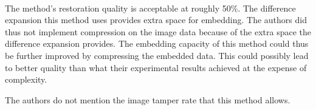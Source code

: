 \documentclass[11pt]{article}
\begin{document}
\hspace{0pt} \\
The method's restoration quality is acceptable at roughly 50\%. 
The difference expansion this method uses provides extra space for embedding.
The authors did thus not implement compression on the image data because of the extra space the difference expansion provides.
The embedding capacity of this method could thus be further improved by compressing the embedded data. This could possibly lead to better quality than what their experimental results achieved at the expense of complexity.

The authors do not mention the image tamper rate that this method allows.



\end{document}
